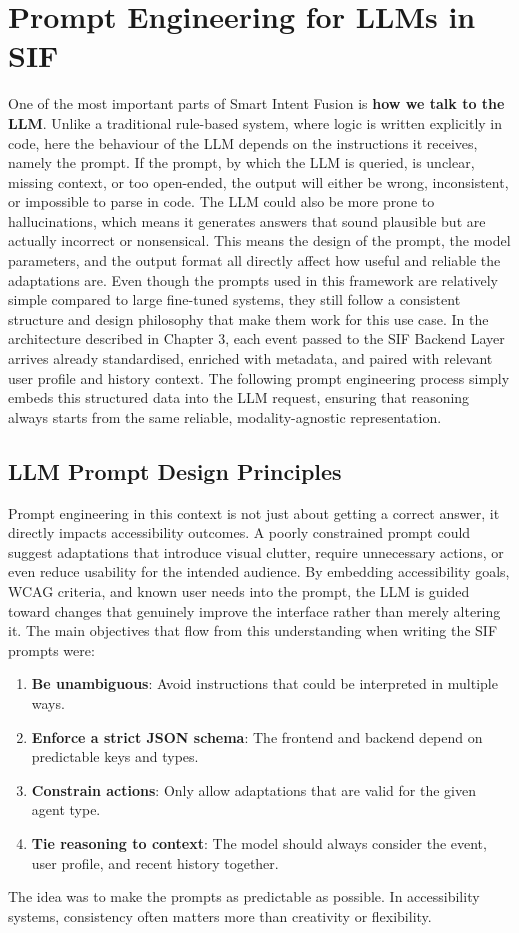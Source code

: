 \documentclass[openany]{book}
\begin{document}
\section{Prompt Engineering for LLMs in SIF}
One of the most important parts of Smart Intent Fusion is \textbf{how we talk to the LLM}.
Unlike a traditional rule-based system, where logic is written explicitly in code, here the behaviour of the LLM depends on the instructions it receives, namely the prompt.
If the prompt, by which the LLM is queried, is unclear, missing context, or too open-ended, the output will either be wrong, inconsistent, or impossible to parse in code.
The LLM could also be more prone to hallucinations, which means it generates answers that sound plausible but are actually incorrect or nonsensical. This means the design of the prompt, the model parameters, and the output format all directly affect how useful and reliable the adaptations are. Even though the prompts used in this framework are relatively simple compared to large fine-tuned systems, they still follow a consistent structure and design philosophy that make them work for this use case. In the architecture described in Chapter 3, each event passed to the SIF Backend Layer arrives already standardised, enriched with metadata, and paired with relevant user profile and history context. The following prompt engineering process simply embeds this structured data into the LLM request, ensuring that reasoning always starts from the same reliable, modality-agnostic representation.

\subsection{LLM Prompt Design Principles}
Prompt engineering in this context is not just about getting a correct answer, it directly impacts accessibility outcomes. A poorly constrained prompt could suggest adaptations that introduce visual clutter, require unnecessary actions, or even reduce usability for the intended audience. By embedding accessibility goals, WCAG criteria, and known user needs into the prompt, the LLM is guided toward changes that genuinely improve the interface rather than merely altering it.
The main objectives that flow from this understanding when writing the SIF prompts were:
\begin{enumerate}
    \item \textbf{Be unambiguous}: Avoid instructions that could be interpreted in multiple ways.
    \item \textbf{Enforce a strict JSON schema}: The frontend and backend depend on predictable keys and types.
    \item \textbf{Constrain actions}: Only allow adaptations that are valid for the given agent type.
    \item \textbf{Tie reasoning to context}: The model should always consider the event, user profile, and recent history together.
\end{enumerate}
The idea was to make the prompts as predictable as possible. In accessibility systems, consistency often matters more than creativity or flexibility.
\end{document}

